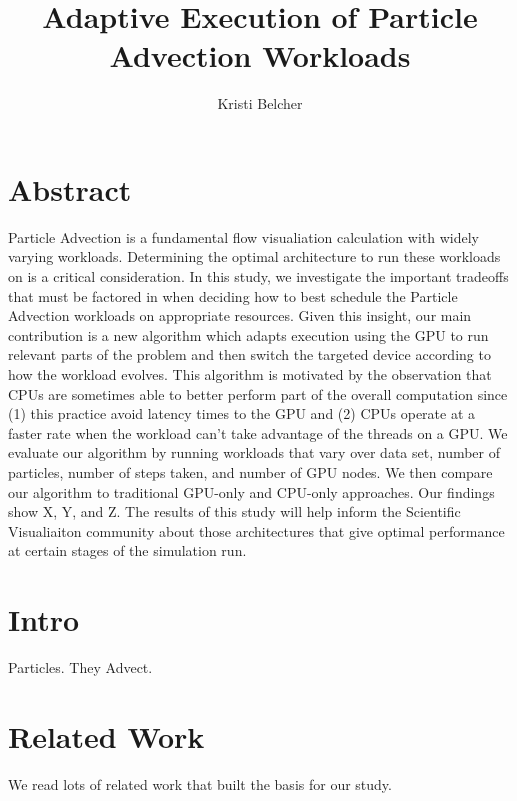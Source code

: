 \documentclass{IEEEtran}
\title{Adaptive Execution of Particle Advection Workloads}
\author{Kristi Belcher}
\begin{document}
\maketitle
%
\section{Abstract}
Particle Advection is a fundamental flow visualiation calculation with widely varying workloads. 
%
Determining the optimal architecture to run these workloads on is a critical consideration. 
%
In this study, we investigate the important tradeoffs that must be factored in when deciding how to best schedule the Particle Advection workloads on appropriate resources. 
%
Given this insight, our main contribution is a new algorithm which adapts execution using the GPU to run relevant parts of the problem and then switch the targeted device according to how the workload evolves.
%
This algorithm is motivated by the observation that CPUs are sometimes able to better perform part of the overall computation since (1) this practice avoid latency times to the GPU and (2) CPUs operate at a faster rate when the workload can't take advantage of the threads on a GPU.
%
We evaluate our algorithm by running workloads that vary over data set, number of particles, number of steps taken, and number of GPU nodes.
%
We then compare our algorithm to traditional GPU-only and CPU-only approaches.
%
Our findings show X, Y, and Z.
%
The results of this study will help inform the Scientific Visualiaiton community about those architectures that give optimal performance at certain stages of the simulation run.
%
\section{Intro}
Particles. They Advect.
%
\section{Related Work}
We read lots of related work that built the basis for our study.
%
\end{document}
